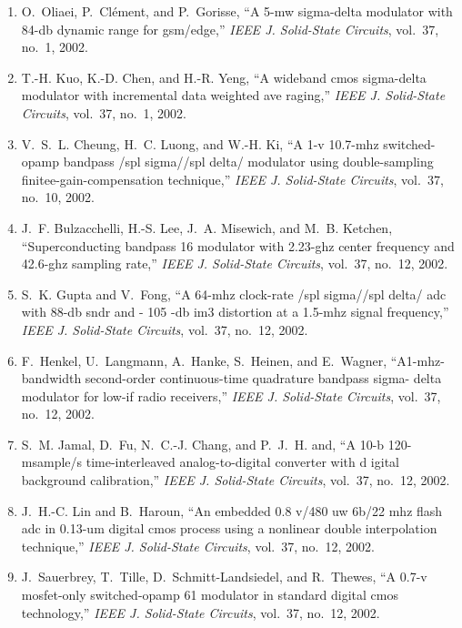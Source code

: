 \begin{enumerate}
\item
O.~Oliaei, P.~Clément, and P.~Gorisse, ``A 5-mw sigma-delta modulator with
  84-db dynamic range for gsm/edge,'' \emph{{IEEE} J. Solid-State Circuits},
  vol.~37, no.~1, 2002.

\item
T.-H. Kuo, K.-D. Chen, and H.-R. Yeng, ``A wideband cmos sigma-delta modulator
  with incremental data weighted ave raging,'' \emph{{IEEE} J. Solid-State
  Circuits}, vol.~37, no.~1, 2002.

\item
V.~S.~L. Cheung, H.~C. Luong, and W.-H. Ki, ``A 1-v 10.7-mhz switched-opamp
  bandpass /spl sigma//spl delta/ modulator using double-sampling
  finitee-gain-compensation technique,'' \emph{{IEEE} J. Solid-State Circuits},
  vol.~37, no.~10, 2002.

\item
J.~F. Bulzacchelli, H.-S. Lee, J.~A. Misewich, and M.~B. Ketchen,
  ``Superconducting bandpass 16 modulator with 2.23-ghz center frequency and
  42.6-ghz sampling rate,'' \emph{{IEEE} J. Solid-State Circuits}, vol.~37,
  no.~12, 2002.

\item
S.~K. Gupta and V.~Fong, ``A 64-mhz clock-rate /spl sigma//spl delta/ adc with
  88-db sndr and - 105 -db im3 distortion at a 1.5-mhz signal frequency,''
  \emph{{IEEE} J. Solid-State Circuits}, vol.~37, no.~12, 2002.

\item
F.~Henkel, U.~Langmann, A.~Hanke, S.~Heinen, and E.~Wagner, ``A1-mhz-bandwidth
  second-order continuous-time quadrature bandpass sigma- delta modulator for
  low-if radio receivers,'' \emph{{IEEE} J. Solid-State Circuits}, vol.~37,
  no.~12, 2002.

\item
S.~M. Jamal, D.~Fu, N.~C.-J. Chang, and P.~J.~H. and, ``A 10-b 120-msample/s
  time-interleaved analog-to-digital converter with d igital background
  calibration,'' \emph{{IEEE} J. Solid-State Circuits}, vol.~37, no.~12, 2002.

\item
J.~H.-C. Lin and B.~Haroun, ``An embedded 0.8 v/480 uw 6b/22 mhz flash adc in
  0.13-um digital cmos process using a nonlinear double interpolation
  technique,'' \emph{{IEEE} J. Solid-State Circuits}, vol.~37, no.~12, 2002.

\item
J.~Sauerbrey, T.~Tille, D.~Schmitt-Landsiedel, and R.~Thewes, ``A 0.7-v
  mosfet-only switched-opamp 61 modulator in standard digital cmos
  technology,'' \emph{{IEEE} J. Solid-State Circuits}, vol.~37, no.~12, 2002.


\end{enumerate}

